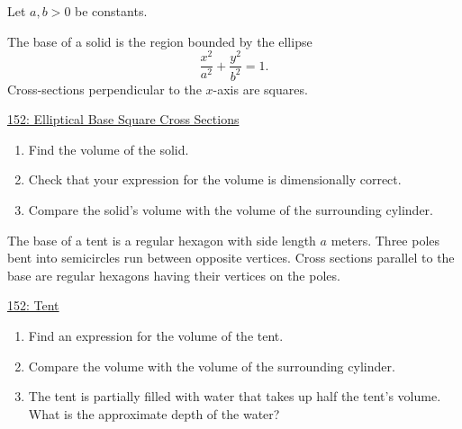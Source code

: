 \documentclass{ximera}
\begin{document}
\begin{question} \label{QoFDerf323f}
Let $a,b>0$ be constants.

The base of a solid is the region bounded by the ellipse
\[
    \frac{x^2}{a^2} + \frac{y^2}{b^2} = 1.
\]
Cross-sections perpendicular to the $x$-axis are squares. 

\begin{onlineOnly}
    \begin{center}
\end{center}
\end{onlineOnly}

\href{https://www.desmos.com/3d/zbcupsnbjv}{152: Elliptical Base Square Cross Sections}


\begin{enumerate}
\item Find the volume of the solid.

\item Check that your expression for the volume is dimensionally correct.

\item Compare the solid's volume with the volume of the surrounding cylinder.

\end{enumerate} 

\end{question}


\begin{question} \label{Q88rew3efds}

The base of a tent is a regular hexagon with side length $a$ meters. Three poles bent into semicircles run between opposite vertices. Cross sections parallel to the base are regular hexagons having their vertices on the poles.

\begin{onlineOnly}
    \begin{center}
\end{center}
\end{onlineOnly}

\href{https://www.desmos.com/3d/wczn2fml4l}{152: Tent}

\begin{enumerate}
\item Find an expression for the volume of the tent.

\item Compare the volume with the volume of the surrounding cylinder.

\item The tent is partially filled with water that takes up half the tent's volume. What is the approximate depth of the water?

\end{enumerate}


\end{question}
\end{document}

